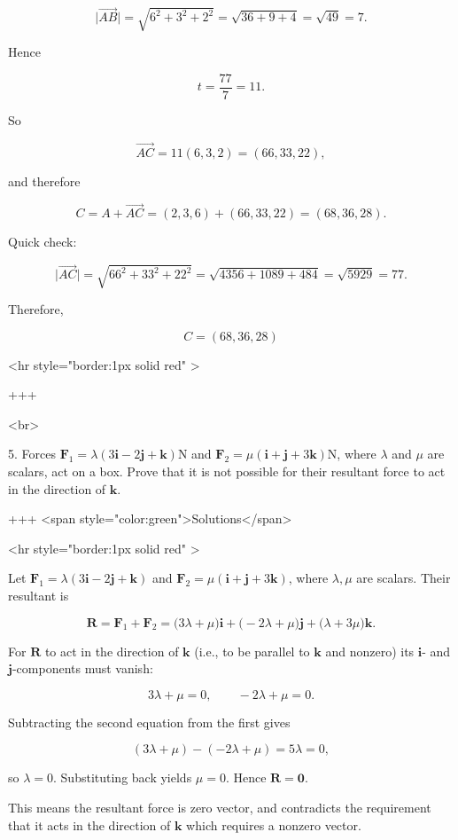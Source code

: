 $$
\lvert\overrightarrow{AB}\rvert=\sqrt{6^2+3^2+2^2}=\sqrt{36+9+4}=\sqrt{49}=7.
$$


Hence

$$
t=\frac{77}{7}=11.
$$


So

$$
\overrightarrow{AC}=11(6,3,2)=(66,33,22),
$$

and therefore

$$
C=A+\overrightarrow{AC}=(2,3,6)+(66,33,22)=(68,36,28).
$$


Quick check:

$$
\lvert\overrightarrow{AC}\rvert=\sqrt{66^2+33^2+22^2}=\sqrt{4356+1089+484}=\sqrt{5929}=77.
$$


Therefore,

$$
C=(68,36,28)
$$

<hr style="border:1px solid red" >

+++

<br>

5. Forces $\mathbf{F}_{1}=\lambda(3 \mathbf{i}-2 \mathbf{j}+\mathbf{k}) \mathrm{N}$ and $\mathbf{F}_{2}=\mu(\mathbf{i}+\mathbf{j}+3 \mathbf{k}) \mathrm{N}$, where $\lambda$ and $\mu$ are scalars, act on a box. Prove that it is not possible for their resultant force to act in the direction of $\mathbf{k}$.

+++ <span style="color:green">Solutions</span>

<hr style="border:1px solid red" >

Let $\mathbf{F}_1=\lambda(3\mathbf{i}-2\mathbf{j}+\mathbf{k})$ and $\mathbf{F}_2=\mu(\mathbf{i}+\mathbf{j}+3\mathbf{k})$, where $\lambda,\mu$ are scalars. Their resultant is

$$
\mathbf{R}=\mathbf{F}_1+\mathbf{F}_2
=\bigl(3\lambda+\mu\bigr)\mathbf{i}+\bigl(-2\lambda+\mu\bigr)\mathbf{j}+\bigl(\lambda+3\mu\bigr)\mathbf{k}.
$$


For $\mathbf{R}$ to act in the direction of $\mathbf{k}$ (i.e., to be parallel to $\mathbf{k}$ and nonzero) its $\mathbf{i}$- and $\mathbf{j}$-components must vanish:

$$
3\lambda+\mu=0,\qquad -2\lambda+\mu=0.
$$

Subtracting the second equation from the first gives

$$
(3\lambda+\mu)-(-2\lambda+\mu)=5\lambda=0,
$$

so $\lambda=0$. Substituting back yields $\mu=0$. Hence $\mathbf{R}=\mathbf{0}$.

This means the resultant force is zero vector, and contradicts the requirement that it acts in the direction of $\mathbf{k}$ which requires a nonzero vector.

